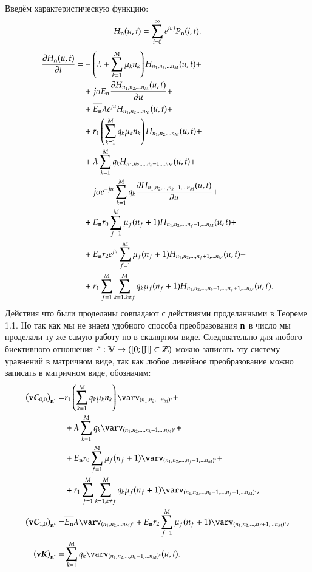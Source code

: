 Введём характеристическую функцию:
\[{H}_{\bold{n}}(u,t)=\sum_{i=0}^\infty e^{iuj}{P}_{\bold{n}}(i,t).\]
\begin{equation*}\begin{aligned}
\pdv{{H}_{\bold{n}}(u,t)}{t}=
    &-\left( {\lambda+\sum_{{k}=1}^{M}\mu_{k}{n}_{k}} \right){H}_{{n}_1, {n}_2, ... {n}_{M}}(u,t)+\\
    &+j \sigma E_{\bold{n}} \pdv{ {H}_{{n}_1, {n}_2, ... {n}_{M}} (u,t)}{u}(i,t) + \\
    &+\overline{E_{\bold{n}}} \lambda e^{ju} {H}_{{n}_1, {n}_2, ... {n}_{M}}(u,t)+\\
    &+r_1 \left( {\sum_{{k}=1}^{M} q_{k}\mu_{k}{n}_{k}} \right) {H}_{{n}_1, {n}_2, ... {n}_{M}}(u,t) + \\
    &+\lambda\sum_{k=1}^{M}q_k {H}_{{n}_1, {n}_2, ... , {n}_{k} - 1, ... {n}_{M}}(u,t) + \\
    &-j \sigma  e^{-ju} \sum_{k=1}^{M}q_k \pdv{ {H}_{{n}_1, {n}_2, ... , {n}_{k} - 1, ... {n}_{M}} (u,t)}{u} + \\
    &+E_{\bold{n}} r_0 \sum_{f=1}^{M} \mu_f (n_f + 1) {H}_{{n}_1, {n}_2, ... , {n}_{f} + 1, ... {n}_{M}}(u,t) + \\
    &+E_{\bold{n}} r_2 e^{ju} \sum_{f=1}^{M} \mu_f (n_f + 1) {H}_{{n}_1, {n}_2, ... , {n}_{f} + 1, ... {n}_{M}}(u,t) + \\
    &+r_1 \sum_{{f}=1}^{M} \sum_{{k}=1, {k} \neq {f}}^{M}
        q_k \mu_f (n_f+1) {H}_{{n}_1, {n}_2, ... , {n}_{k} - 1, ... , {n}_{f} + 1, ... {n}_{M}}(u,t).
\end{aligned}\end{equation*}
Действия что были проделаны совпадают с действиями проделанными в Теореме 1.1.
Но так как мы не знаем удобного способа преобразования \(\bold{n}\) 
в число мы проделали ту же самую работу но в скалярном виде.
Следовательно для любого биективного отношения
\(\cdot^* : \mathbb{V} \rightarrow ([0;|\mathbb{J}|] \subset \mathbb{Z} )\)
можно записать эту систему уравнений в матричном виде,
так как любое линейное преобразование можно записать в
матричном виде, обозначим:
\begin{equation}\begin{aligned}
\Q{\bold{v}\boldsymbol{C}_{0,0}}_{\bold{n}^*} =&
    r_1 \Q{\allExecutionRelativeIntensity{n}{k}} \seqStandartStar{\varv}{n} + \\
    &+\lambda\sum_{k=1}^{M}q_k \seqMinusStar{\varv}{n}{k} + \\
    &+\En r_0 \sum_{f=1}^{M} \mu_f (n_f + 1) \seqPlusStar{\varv}{n}{f} + \\
    &+r_1 \feedbackSum{f}{k} q_k \mu_f (n_f+1) \seqMinusPlusStar{\varv}{n}{k}{f}, \\
\Q{\bold{v}\boldsymbol{C}_{1,0}}_{\bold{n}^*} =
    &\overline{\En} \lambda \seqStandartStar{\varv}{n}+
    \En r_2 \sum_{f=1}^{M} \mu_f (n_f + 1) \seqPlusStar{\varv}{n}{f}, \\
\Q{\bold{v}\boldsymbol{K}}_{\bold{n}^*} =
    &\sum_{k=1}^{M}q_k\seqMinusStar{\varv}{n}{k}(u,t).
\end{aligned}\end{equation}
